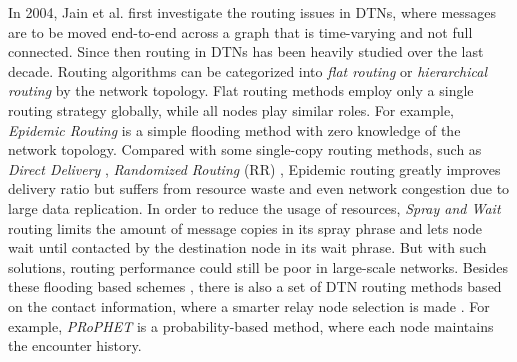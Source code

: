 \documentclass[conference]{IEEEtran}
\begin{document}
In 2004, Jain et al. \cite{JainFall-771} first investigate the routing issues in DTNs, where messages are to be moved
end-to-end across a graph that is time-varying and not full connected. Since then routing in DTNs has been heavily studied \cite{cao2013routing,ZXSW13-DTN-survey} over the last decade.
Routing algorithms can be categorized into \emph{flat routing} or \emph{hierarchical routing} by the network topology.
Flat routing methods employ only a single routing strategy globally, while all nodes play similar roles. For example,
\emph{Epidemic Routing} \cite{VahdatBecker-779} is a simple flooding method with zero knowledge of the network topology.  Compared with some single-copy routing methods, such as \emph{Direct Delivery} \cite{BalasubramanianLevine-489}, \emph{Randomized Routing} (RR) \cite{LeightonMaggs-780},  Epidemic routing greatly improves delivery ratio but suffers from resource waste and even network congestion due to large data replication. In order to reduce the usage of resources, \emph{Spray and Wait} routing \cite{SpyropoulosPsounis-772} limits the amount of message copies in its spray phrase and lets node wait until contacted by the destination node in its wait phrase. But with such solutions, routing performance could still be poor in large-scale networks.
Besides these flooding based schemes \cite{VahdatBecker-779,GrossglauserTse-777,SpyropoulosPsounis-778}, there is also a set of DTN routing methods based on the contact information, where a smarter relay node selection is made \cite{LindgrenDoria-782,BurgessGallagher-783}.
For example, \emph{PRoPHET} is a probability-based method, where each node maintains the encounter history.
\end{document}
